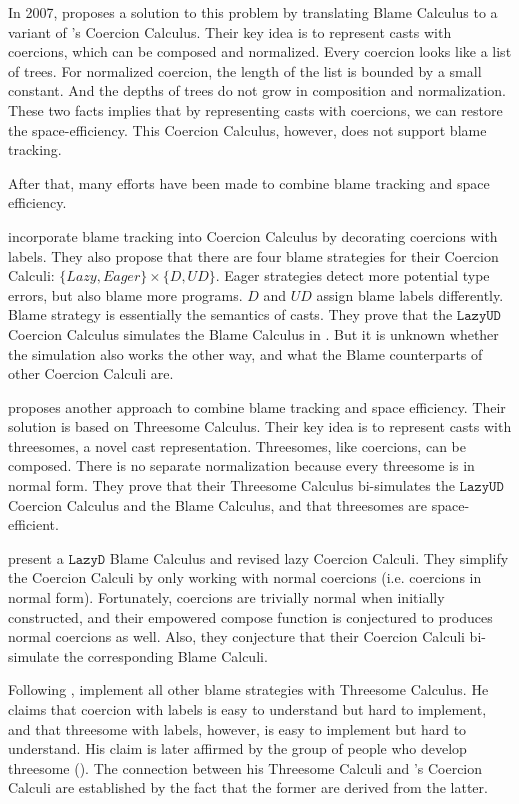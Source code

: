 \documentclass[acmsmall,review,anonymous]{acmart}\settopmatter{printfolios=true,printccs=false,printacmref=false}
\newcommand{\lazyUD}{$\mathtt{Lazy UD}$}
\newcommand{\lazyD}{$\mathtt{Lazy D}$}
\begin{document}
In 2007, \citet{herman2010space} proposes a solution to this problem by 
translating Blame Calculus to a variant of \citet{henglein1994dynamic}'s 
Coercion Calculus. Their key idea is to represent casts with coercions, 
which can be composed and normalized. Every coercion looks like a list of 
trees. For normalized coercion, the length of the list is bounded by a small 
constant. And the depths of trees do not grow in composition and 
normalization. These two facts implies that by representing casts with 
coercions, we can restore the space-efficiency. This 
Coercion Calculus, however, does not support blame tracking. 

After that, many efforts have been made to combine blame tracking and 
space efficiency. 

\citet{siek2009exploring} incorporate blame tracking into Coercion Calculus by 
decorating coercions with labels. They also propose that there are four blame 
strategies for their Coercion Calculi:
$ \{Lazy, Eager\} \times \{D, UD\} $. 
Eager strategies detect more potential type errors, 
but also blame more programs.
$ D $ and $ UD $ assign blame labels differently.
Blame strategy is essentially the semantics of casts.
They prove that the \lazyUD{} Coercion Calculus simulates the Blame Calculus 
in \cite{wadler2009well}. But it is unknown whether the simulation also works 
the other way, and what the Blame counterparts of other Coercion Calculi are.

\citet{siek2010threesomes} proposes another approach to combine blame 
tracking and space efficiency. Their solution is based on Threesome Calculus. 
Their key idea is to represent casts with threesomes, a novel cast 
representation. Threesomes, like coercions, can be composed. There is no 
separate normalization because every threesome is in normal form. 
They prove that their Threesome Calculus bi-simulates
the \lazyUD{} Coercion Calculus and the Blame Calculus, and that threesomes are 
space-efficient.

\citet{siek2012interpretations} present a \lazyD{} Blame Calculus and revised 
lazy Coercion Calculi. They simplify the Coercion Calculi by only working with 
normal coercions (i.e. coercions in normal form). 
Fortunately, coercions are trivially normal when initially constructed, and 
their empowered compose function is conjectured to produces normal coercions as 
well. Also, they conjecture that their Coercion Calculi bi-simulate the 
corresponding Blame Calculi.

Following \citet{siek2010threesomes}, \citet{garcia2013calculating} 
implement all other blame strategies with Threesome Calculus. 
He claims that 
coercion with labels is easy to understand but hard to implement, 
and that 
threesome with labels, however, is easy to implement but hard to understand.
His claim is later affirmed by the group of people who develop threesome 
(\citet{siek2015blame}).
The connection 
between his Threesome Calculi and \citet{siek2009exploring}'s Coercion 
Calculi are established by the fact that the former are derived from the latter.
\end{document}
